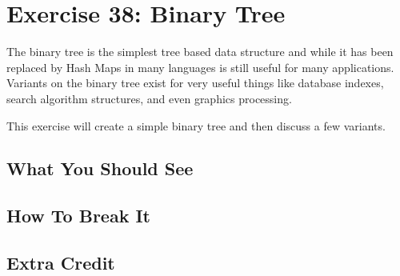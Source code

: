 \chapter{Exercise 38: Binary Tree}

The binary tree is the simplest tree based data structure and while it has been replaced
by Hash Maps in many languages is still useful for many applications.  Variants on the
binary tree exist for very useful things like database indexes, search algorithm structures,
and even graphics processing.

This exercise will create a simple binary tree and then discuss a few variants.

\section{What You Should See}


\section{How To Break It}


\section{Extra Credit}



